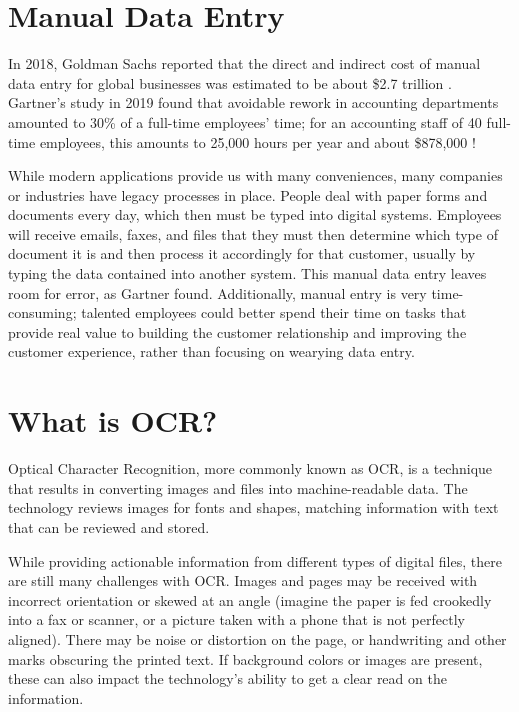 \documentclass[conference, draftcls]{IEEEtran}
\begin{document}
\section{Manual Data Entry} \label{sectionManualDataEntry}
In 2018, Goldman Sachs reported that the direct and indirect cost of manual data entry for global businesses was estimated to be about \$2.7 trillion \cite{schneider2018b2b}. Gartner's study in 2019 found that avoidable rework in accounting departments amounted to 30\% of a full-time employees' time; for an accounting staff of 40 full-time employees, this amounts to 25,000 hours per year and about \$878,000 \cite{lavelle2019gartner}!

While modern applications provide us with many conveniences, many companies or industries have legacy processes in place. People deal with paper forms and documents every day, which then must be typed into digital systems. Employees will receive emails, faxes, and files that they must then determine which type of document it is and then process it accordingly for that customer, usually by typing the data contained into another system. This manual data entry leaves room for error, as Gartner found. Additionally, manual entry is very time-consuming; talented employees could better spend their time on tasks that provide real value to building the customer relationship and improving the customer experience, rather than focusing on wearying data entry.

\section{What is OCR?} \label{sectionOcr}
Optical Character Recognition, more commonly known as OCR, is a technique that results in converting images and files into machine-readable data. The technology reviews images for fonts and shapes, matching information with text that can be reviewed and stored.

While providing actionable information from different types of digital files, there are still many challenges with OCR. Images and pages may be received with incorrect orientation or skewed at an angle (imagine the paper is fed crookedly into a fax or scanner, or a picture taken with a phone that is not perfectly aligned). There may be noise or distortion on the page, or handwriting and other marks obscuring the printed text. If background colors or images are present, these can also impact the technology's ability to get a clear read on the information.
\end{document}
